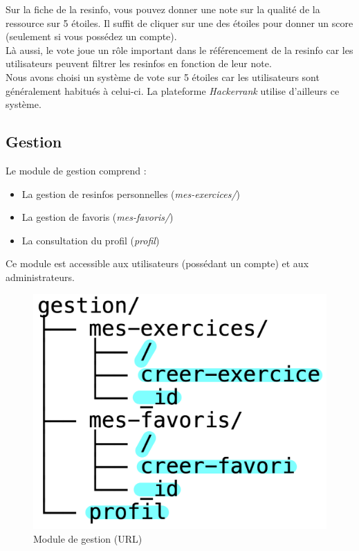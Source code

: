 
Sur la \gls{fiche} de la \gls{resinfo}, vous pouvez donner une note sur la qualité de la ressource sur 5 étoiles. Il suffit de cliquer sur une des étoiles pour donner un score (seulement si vous possédez un compte).\\

Là aussi, le vote joue un rôle important dans le référencement de la \gls{resinfo} car les utilisateurs peuvent filtrer les \glspl{resinfo} en fonction de leur note.\\

Nous avons choisi un système de vote sur 5 étoiles car les utilisateurs sont généralement habitués à celui-ci. La plateforme \textit{Hackerrank} utilise d'ailleurs ce système.


\subsection{Gestion}

Le module de gestion comprend :

\begin{itemize}
    \item La gestion de \glspl{resinfo} personnelles (\textit{mes-exercices/})
    \item La gestion de favoris (\textit{mes-favoris/})
    \item La consultation du profil (\textit{profil})
\end{itemize}

Ce module est accessible aux utilisateurs (possédant un compte) et aux administrateurs.

\begin{figure}[H]
    \includegraphics[width=\textwidth,height=0.2\textheight,keepaspectratio]{images/client/gestion.jpeg}
    \centering
    \caption[SourceCode : module de gestion (URL)]{Module de gestion (URL)}
\end{figure}

